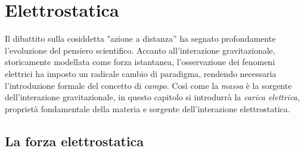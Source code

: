 \documentclass[a4paper,11pt]{report}
\begin{document}
\pagestyle{plain}       %

\tableofcontents
\clearpage


\cleardoublepage        %
\pagestyle{fancy}

\chapter{Elettrostatica}

Il dibattito sulla cosiddetta "azione a distanza'' ha segnato profondamente l'evoluzione del pensiero scientifico. Accanto all'interazione gravitazionale, storicamente modellata come forza istantanea, l'osservazione dei fenomeni elettrici ha imposto un radicale cambio di paradigma, rendendo necessaria l'introduzione formale del concetto di \emph{campo}.
Così come la \emph{massa} è la sorgente dell'interazione gravitazionale, in questo capitolo si introdurrà la \emph{carica elettrica}, proprietà fondamentale della materia e sorgente dell'interazione elettrostatica.

\section{La forza elettrostatica}
\end{document}
